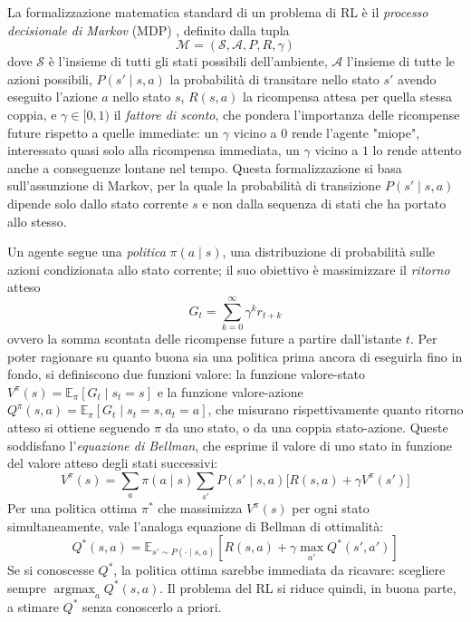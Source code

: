 La formalizzazione matematica standard di un problema di RL è il
\emph{processo decisionale di Markov} (MDP) \citep{suttonbarto2018},
definito dalla tupla
\[\mathcal{M} = (\mathcal{S}, \mathcal{A}, P, R, \gamma)\]
dove $\mathcal{S}$ è l'insieme di tutti gli stati possibili dell'ambiente,
$\mathcal{A}$ l'insieme di tutte le azioni possibili, $P(s' \mid s,a)$ la
probabilità di transitare nello stato $s'$ avendo eseguito l'azione $a$
nello stato $s$, $R(s,a)$ la ricompensa attesa per quella stessa coppia, e
$\gamma \in [0,1)$ il \emph{fattore di sconto}, che pondera l'importanza
delle ricompense future rispetto a quelle immediate: un $\gamma$ vicino a
$0$ rende l'agente "miope", interessato quasi solo alla ricompensa
immediata, un $\gamma$ vicino a $1$ lo rende attento anche a conseguenze
lontane nel tempo. Questa formalizzazione si basa sull'assunzione di Markov, per la quale la
probabilità di transizione $P(s'\mid s,a)$ dipende solo dallo stato
corrente $s$ e non dalla sequenza di stati che ha portato allo stesso.

Un agente segue una \emph{politica} $\pi(a \mid s)$, una distribuzione
di probabilità sulle azioni condizionata allo stato corrente; il suo
obiettivo è massimizzare il \emph{ritorno} atteso
\[G_t = \sum_{k=0}^{\infty} \gamma^k r_{t+k}\]
ovvero la somma scontata delle ricompense future a partire dall'istante
$t$. Per poter ragionare su quanto buona sia una politica prima ancora di
eseguirla fino in fondo, si definiscono due funzioni valore: la
funzione valore-stato $V^\pi(s) = \mathbb{E}_\pi[G_t \mid s_t = s]$ e la
funzione valore-azione $Q^\pi(s,a) = \mathbb{E}_\pi[G_t \mid s_t=s,
    a_t=a]$, che misurano rispettivamente quanto ritorno atteso si ottiene
seguendo $\pi$ da uno stato, o da una coppia stato-azione. Queste
soddisfano l'\emph{equazione di Bellman}, che esprime il valore di uno
stato in funzione del valore atteso degli stati successivi:
\begin{equation}
  V^\pi(s) = \sum_a \pi(a\mid s) \sum_{s'} P(s'\mid s,a) \big[R(s,a) + \gamma V^\pi(s')\big]
\end{equation}
Per una politica ottima $\pi^*$ che massimizza $V^\pi(s)$ per ogni stato
simultaneamente, vale l'analoga equazione di Bellman di ottimalità:
\begin{equation}
  Q^*(s,a) = \mathbb{E}_{s' \sim P(\cdot \mid s,a)}\left[
    R(s,a) + \gamma \max_{a'} Q^*(s', a')
    \right]
  \label{eq:bellman-optimal}
\end{equation}
Se si conoscesse $Q^*$, la politica ottima sarebbe immediata da ricavare:
scegliere sempre $\operatorname*{argmax}_a Q^*(s,a)$. Il problema del RL
si riduce quindi, in buona parte, a stimare $Q^*$ senza conoscerlo a
priori.

